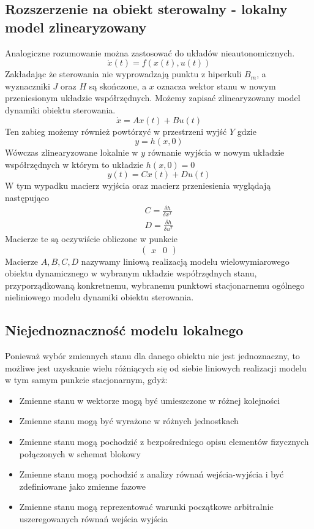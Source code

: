 \documentclass{article}
\begin{document}
	\subsection{Rozszerzenie na obiekt sterowalny - lokalny model zlinearyzowany}
		Analogiczne rozumowanie można zastosować do układów nieautonomicznych.
		\begin{equation}
			\dot{x}(t) = f(x(t), u(t))
		\end{equation}
		Zakładając że sterowania nie wyprowadzają punktu z hiperkuli $B_m$, a wyznaczniki 
		$J$ oraz $H$ są skończone, a $x$ oznacza wektor stanu w nowym przeniesionym układzie współrzędnych.
		Możemy zapisać zlinearyzowany model dynamiki obiektu sterowania.
		\begin{equation}
			\dot{x} = Ax(t) + Bu(t)
		\end{equation}
		Ten zabieg możemy również powtórzyć w przestrzeni wyjść $Y$ gdzie
		\begin{equation}
			y = h(x, 0)
		\end{equation}
		Wówczas zlinearyzowane lokalnie w $y$ równanie wyjścia w nowym układzie współrzędnych
		w którym to układzie $h(x, 0) = 0$
		\begin{equation}
			y(t) = Cx(t) + Du(t)
		\end{equation}
		W tym wypadku macierz wyjścia oraz macierz przeniesienia wyglądają następująco
		\begin{align*}
			C = \frac{\delta h}{\delta x^T} \\
			D = \frac{\delta h}{\delta u^T} 
		\end{align*}
		Macierze te są oczywiście obliczone w punkcie 
		\begin{equation}
			\begin{pmatrix}
				x & 0
			\end{pmatrix}
		\end{equation}
		Macierze $A,B,C,D$ nazywamy
		liniową realizacją modelu wielowymiarowego obiektu
		dynamicznego w wybranym układzie współrzędnych stanu, przyporządkowaną
		konkretnemu, wybranemu punktowi stacjonarnemu ogólnego nieliniowego modelu
		dynamiki obiektu sterowania.
	\subsection{Niejednoznaczność modelu lokalnego}
		Ponieważ wybór zmiennych stanu dla danego obiektu nie jest jednoznaczny, to możliwe
		jest uzyskanie wielu różniących się od siebie liniowych realizacji modelu w tym samym
		punkcie stacjonarnym, gdyż:
		\begin{itemize}
			\item Zmienne stanu w wektorze mogą być umieszczone w różnej kolejności
			\item Zmienne stanu mogą być wyrażone w różnych jednostkach
			\item Zmienne stanu mogą pochodzić z bezpośredniego opisu elementów fizycznych
				połączonych w schemat blokowy
			\item Zmienne stanu mogą pochodzić z analizy równań wejścia-wyjścia i być
				zdefiniowane jako zmienne fazowe
			\item Zmienne stanu mogą reprezentować warunki początkowe arbitralnie
				uszeregowanych równań wejścia wyjścia
		\end{itemize}
\end{document}
